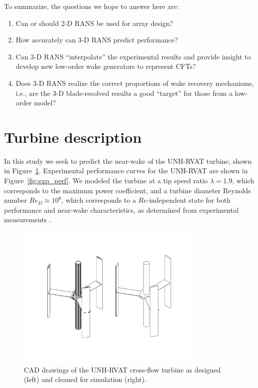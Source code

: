 \documentclass[aip,graphicx]{revtex4-1}
\begin{document}
To summarize, the questions we hope to answer here are:

\begin{enumerate}

    \item Can or should 2-D RANS be used for array design?
    
    \item How accurately can 3-D RANS predict performance?

    \item Can 3-D RANS ``interpolate'' the experimental results and provide insight to develop new low-order wake generators to represent CFTs?

    \item Does 3-D RANS realize the correct proportions of wake recovery
    mechanisms, i.e., are the 3-D blade-resolved results a good ``target'' for
    those from a low-order model?

\end{enumerate}


\section{Turbine description}

In this study we seek to predict the near-wake of the UNH-RVAT turbine, shown in
Figure~\ref{fig:RVAT-CAD}. Experimental performance curves for the UNH-RVAT are
shown in Figure~\ref{fig:exp_perf}. We modeled the turbine at a tip speed ratio
$\lambda=1.9$, which corresponds to the maximum power coefficient, and a turbine
diameter Reynolds number $Re_D \approx 10^6$, which corresponds to a
$Re$-independent state for both performance and near-wake characteristics, as
determined from experimental measurements \cite{Bachant2014,
    Bachant2015-RVAT-Re-dep}.


\begin{figure}[ht]
    \centering
    
    \includegraphics[clip, trim=0 1in 0 1in, width=0.8\textwidth]{figures/CAD}
    
    \caption{CAD drawings of the UNH-RVAT cross-flow turbine as designed (left)
        and cleaned for simulation (right).}
    
    \label{fig:RVAT-CAD}
\end{figure}
\end{document}
